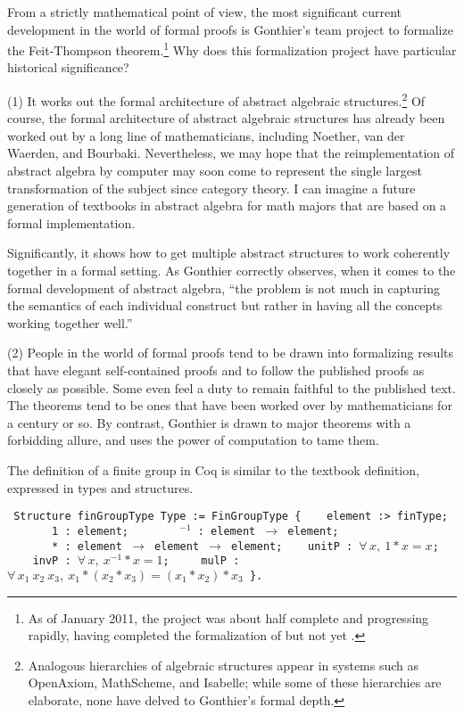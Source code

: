 \documentclass{llncs}
\begin{document}
From a strictly mathematical point of view, the most significant
current development in the world of formal proofs is Gonthier's team
project to formalize the Feit-Thompson theorem.\footnote{As of January
  2011, the project was about half complete and progressing rapidly,
  having completed the formalization of \cite{BG94} but not yet
  \cite{P00}.}  Why does this formalization project have particular
historical significance?

(1) It works out the formal architecture of abstract algebraic
structures.\footnote{Analogous hierarchies of algebraic structures
  appear in systems such as OpenAxiom, MathScheme, and Isabelle; while some of these
  hierarchies are elaborate, none have delved to Gonthier's formal
  depth.}  Of course, the formal architecture of abstract algebraic
structures has already been worked out by a long line of
mathematicians, including Noether, van der Waerden, and Bourbaki.
Nevertheless, we may hope that the reimplementation of abstract
algebra by computer may soon come to represent the single largest
transformation of the subject since category theory.  I can imagine a
future generation of textbooks in abstract algebra for math majors
that are based on a formal implementation.



 Significantly, it shows how to get multiple abstract structures
to work coherently together in a formal setting.  As Gonthier
correctly observes, when it comes to the formal development of
abstract algebra, ``the problem is not much in capturing the semantics
of each individual construct but rather in having all the concepts
working together well.'' %

(2) People in the world of formal proofs tend to be drawn into
formalizing results that have elegant self-contained proofs and to
follow the published proofs as closely as possible.  Some even feel a
duty to remain faithful to the published text.  The theorems tend to
be ones that have been worked over by mathematicians for a century or
so.  By contrast, Gonthier is drawn to major theorems with a
forbidding allure, and uses the power of computation to tame them.

The definition of a finite group in Coq is similar to the textbook definition,
expressed in types and structures.
\bigskip
{

\obeylines\tt
Structure~finGroupType~Type~:= FinGroupType \{
~~~element~:>~finType;
~~~~~~~1~:~element;
~~~~~~\hskip0.8mm ${}^{-1}$~:~element $\to$ element;
~~~~~~~*~:~element $\to$ element $\to$ element;
~~~unitP~:~$\forall\,x,~1*x = x$;
~~~~invP~:~$\forall\,x,~x^{-1} * x = 1$;
~~~~mulP~:~$\forall\,x_1~x_2~x_3,~ x_1 * (x_2 * x_3) = (x_1 * x_2) * x_3$
\}.

}
\end{document}
